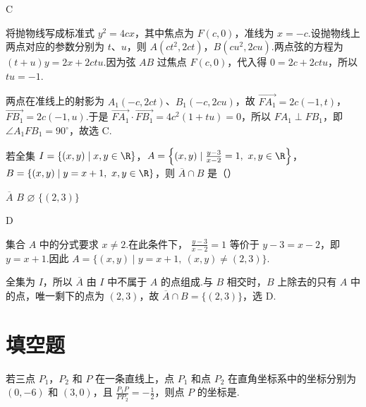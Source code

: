 \documentclass[UTF8,a4paper,oneside,11pt]{ctexbook}
\begin{document}
\begin{answer}
C
\end{answer}

\begin{solution}
将抛物线写成标准式 \(y^2=4cx\)，其中焦点为 \(F(c,0)\)，准线为 \(x=-c\).设抛物线上两点对应的参数分别为 \(t\)、\(u\)，则
\(A(ct^2,2ct)\)，\(B(cu^2,2cu)\).两点弦的方程为
\((t+u)y=2x+2ctu\).因为弦 \(AB\) 过焦点 \(F(c,0)\)，代入得
\(0=2c+2ctu\)，所以 \(tu=-1\).

两点在准线上的射影为 \(A_1(-c,2ct)\)、\(B_1(-c,2cu)\)，故
\(\overrightarrow{FA_1}=2c(-1,t)\)，\(\overrightarrow{FB_1}=2c(-1,u)\).于是
\(\overrightarrow{FA_1}\cdot\overrightarrow{FB_1}=4c^2(1+tu)=0\)，所以 \(FA_1\perp FB_1\)，即 \(\angle A_1FB_1=90^\circ\)，故选 C.
\end{solution}

\begin{problem}

若全集 \(I=\{(x,y)\mid x,y\in\R\}\)，\(A=\left\{(x,y)\mid \frac{y-3}{x-2}=1,\ x,y\in\R \right\}\)，\(B=\{(x,y)\mid y=x+1,\ x,y\in\R\}\)，则 \(\overline{A}\cap B\) 是（\quad）

\choices
    {\(\overline{A}\)}
    {\(B\)}
    {\(\varnothing\)}
    {\(\{(2,3)\}\)}
\end{problem}

\begin{answer}
D
\end{answer}

\begin{solution}
集合 \(A\) 中的分式要求 \(x\ne2\).在此条件下，
\(\frac{y-3}{x-2}=1\) 等价于 \(y-3=x-2\)，即 \(y=x+1\).因此
\(A=\{(x,y)\mid y=x+1,\ (x,y)\ne(2,3)\}\).

全集为 \(I\)，所以 \(\overline A\) 由 \(I\) 中不属于 \(A\) 的点组成.与 \(B\) 相交时，\(B\) 上除去的只有 \(A\) 中的点，唯一剩下的点为 \((2,3)\)，故
\(\overline A\cap B=\{(2,3)\}\)，选 D.
\end{solution}

\section{填空题}

\begin{problem}

若三点 \(P_1\)，\(P_2\) 和 \(P\) 在一条直线上，点 \(P_1\) 和点 \(P_2\) 在直角坐标系中的坐标分别为 \((0,-6)\) 和 \((3,0)\)，且 \(\frac{P_1P}{PP_2}=-\frac{1}{2}\)，则点 \(P\) 的坐标是\fillinblank{}.
\end{problem}
\end{document}
